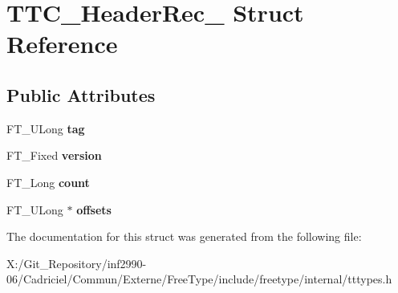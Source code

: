 \hypertarget{struct_t_t_c___header_rec__}{\section{T\-T\-C\-\_\-\-Header\-Rec\-\_\- Struct Reference}
\label{struct_t_t_c___header_rec__}
}
\subsection*{Public Attributes}
\begin{DoxyCompactItemize}
\item 
\hypertarget{struct_t_t_c___header_rec___a7fc09906e402f8937b6ca207c84453b4}{F\-T\-\_\-\-U\-Long {\bfseries tag}}\label{struct_t_t_c___header_rec___a7fc09906e402f8937b6ca207c84453b4}

\item 
\hypertarget{struct_t_t_c___header_rec___aa9ecb33279c68c3c00c1232441da5801}{F\-T\-\_\-\-Fixed {\bfseries version}}\label{struct_t_t_c___header_rec___aa9ecb33279c68c3c00c1232441da5801}

\item 
\hypertarget{struct_t_t_c___header_rec___a0bf5898e9d8c55bc74f51712a5ad1b58}{F\-T\-\_\-\-Long {\bfseries count}}\label{struct_t_t_c___header_rec___a0bf5898e9d8c55bc74f51712a5ad1b58}

\item 
\hypertarget{struct_t_t_c___header_rec___a2ab33f787e8085d7086968fb931060b5}{F\-T\-\_\-\-U\-Long $\ast$ {\bfseries offsets}}\label{struct_t_t_c___header_rec___a2ab33f787e8085d7086968fb931060b5}

\end{DoxyCompactItemize}


The documentation for this struct was generated from the following file\-:\begin{DoxyCompactItemize}
\item 
X\-:/\-Git\-\_\-\-Repository/inf2990-\/06/\-Cadriciel/\-Commun/\-Externe/\-Free\-Type/include/freetype/internal/tttypes.\-h\end{DoxyCompactItemize}
